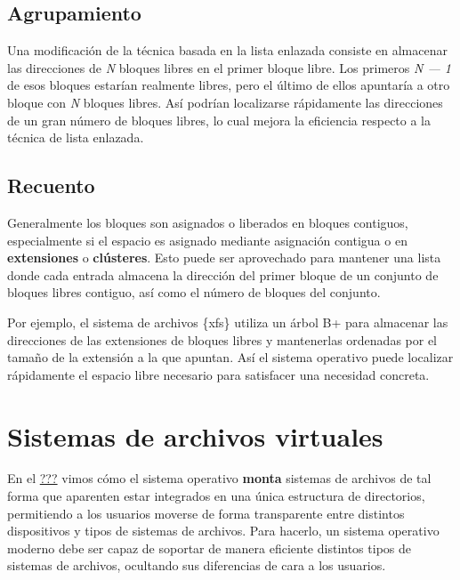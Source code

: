 \subsection{Agrupamiento}\label{_agrupamiento}

Una modificación de la técnica basada en la lista enlazada consiste en
almacenar las direcciones de \emph{N} bloques libres en el primer bloque
libre. Los primeros \emph{N --- 1} de esos bloques estarían realmente
libres, pero el último de ellos apuntaría a otro bloque con \emph{N}
bloques libres. Así podrían localizarse rápidamente las direcciones de
un gran número de bloques libres, lo cual mejora la eficiencia respecto
a la técnica de lista enlazada.

\subsection{Recuento}\label{_recuento}

Generalmente los bloques son asignados o liberados en bloques contiguos,
especialmente si el espacio es asignado mediante asignación contigua o
en \textbf{extensiones} o \textbf{clústeres}. Esto puede ser aprovechado
para mantener una lista donde cada entrada almacena la dirección del
primer bloque de un conjunto de bloques libres contiguo, así como el
número de bloques del conjunto.

Por ejemplo, el sistema de archivos \{xfs\} utiliza un árbol B+ para
almacenar las direcciones de las extensiones de bloques libres y
mantenerlas ordenadas por el tamaño de la extensión a la que apuntan.
Así el sistema operativo puede localizar rápidamente el espacio libre
necesario para satisfacer una necesidad concreta.

\section{Sistemas de archivos
virtuales}\label{_sistemas_de_archivos_virtuales}

En el \hyperref[_montaje_de_sistemas_de_archivos]{???} vimos cómo el
sistema operativo \textbf{monta} sistemas de archivos de tal forma que
aparenten estar integrados en una única estructura de directorios,
permitiendo a los usuarios moverse de forma transparente entre distintos
dispositivos y tipos de sistemas de archivos. Para hacerlo, un sistema
operativo moderno debe ser capaz de soportar de manera eficiente
distintos tipos de sistemas de archivos, ocultando sus diferencias de
cara a los usuarios.

